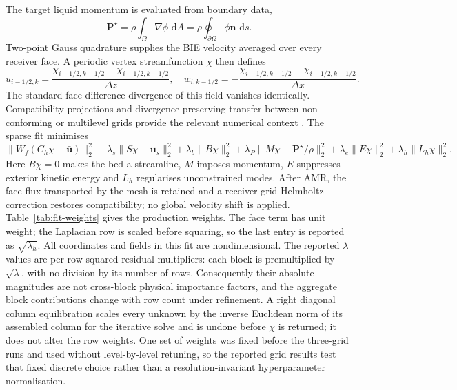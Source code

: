 \documentclass[11pt]{article}
\newcommand{\dd}{\,\mathrm{d}}
\begin{document}
The target liquid momentum is evaluated from boundary data,
\begin{equation}
\boldsymbol P^\star=\rho\int_\Omega\nabla\phi\,\dd A
=\rho\oint_{\partial\Omega}\phi\boldsymbol n\,\dd s.
\label{eq:target-momentum}
\end{equation}
Two-point Gauss quadrature supplies the BIE velocity averaged over every
receiver face.  A periodic vertex streamfunction $\chi$ then defines
\begin{equation}
u_{i-1/2,k}=\frac{\chi_{i-1/2,k+1/2}-\chi_{i-1/2,k-1/2}}{\Delta z},
\quad
w_{i,k-1/2}=-\frac{\chi_{i+1/2,k-1/2}-\chi_{i-1/2,k-1/2}}{\Delta x}.
\label{eq:mac-curl}
\end{equation}
The standard face-difference divergence of this field vanishes identically.
Compatibility projections and divergence-preserving transfer between
non-conforming or multilevel grids provide the relevant numerical context
\cite{SunWheeler2006,CervoneManservisiScardovelli2011,GorgesEtAl2022}.
The sparse fit minimises
\begin{equation}
\|W_f(C_h\chi-\bar{\boldsymbol u})\|_2^2
+\lambda_s\|S\chi-\boldsymbol u_s\|_2^2
+\lambda_b\|B\chi\|_2^2
+\lambda_P\|M\chi-\boldsymbol P^\star/\rho\|_2^2
+\lambda_e\|E\chi\|_2^2+\lambda_h\|L_h\chi\|_2^2.
\label{eq:mac-fit}
\end{equation}
Here $B\chi=0$ makes the bed a streamline, $M$ imposes momentum, $E$ suppresses
exterior kinetic energy and $L_h$ regularises unconstrained modes.  After AMR,
the face flux transported by the mesh is retained and a receiver-grid
Helmholtz correction restores compatibility; no global velocity shift is
applied.  Table~\ref{tab:fit-weights} gives the production weights.  The face
term has unit weight; the Laplacian row is scaled before squaring, so the last
entry is reported as $\sqrt{\lambda_h}$.  All coordinates and fields in this
fit are nondimensional.  The reported $\lambda$ values are per-row
squared-residual multipliers: each block is premultiplied by
$\sqrt{\lambda}$, with no division by its number of rows.  Consequently their
absolute magnitudes are not cross-block physical importance factors, and the
aggregate block contributions change with row count under refinement.  A
right diagonal column equilibration scales every unknown by the inverse
Euclidean norm of its assembled column for the iterative solve and is undone
before $\chi$ is returned; it does not alter the row weights.  One set of
weights was fixed before the three-grid runs and used without level-by-level
retuning, so the reported grid results test that fixed discrete choice rather
than a resolution-invariant hyperparameter normalisation.
\end{document}
